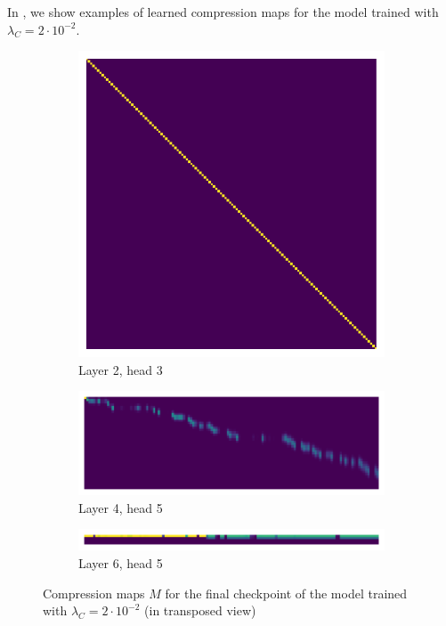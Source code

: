 In , we show examples of learned compression maps for the model trained with $\lambda_C = 2 \cdot 10^{-2}$.

\begin{figure}[!ht]
    \centering
    \begin{subfigure}[b]{0.6\columnwidth}
         \includegraphics[width=\linewidth]{sources/part_2/kv_cache/imgs/layer1_head2.pdf}
         \caption{Layer 2, head 3}
    \end{subfigure}
    \begin{subfigure}[b]{0.6\columnwidth}
         \includegraphics[width=\linewidth]{sources/part_2/kv_cache/imgs/layer3_head4.pdf}
         \caption{Layer 4, head 5}
    \end{subfigure}
    \begin{subfigure}[b]{0.6\columnwidth}
         \includegraphics[width=\linewidth]{sources/part_2/kv_cache/imgs/layer5_head4.pdf}
         \caption{Layer 6, head 5}
    \end{subfigure}
    
    \caption{Compression maps $M$ for the final checkpoint of the model trained with $\lambda_C = 2 \cdot 10^{-2}$ (in transposed view)}
    \label{fig:comp_maps}
\end{figure}

